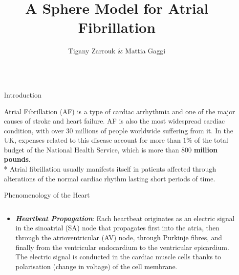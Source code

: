 \documentclass[final,hyperref={pdfpagelabels=false}]{beamer}
\title{\huge A Sphere Model for Atrial Fibrillation} %
\author{Tigany Zarrouk \& Mattia Gaggi } %
\institute{Supervisor: Kim Christensen.  Condensed Matter Theory Group---Imperial College London} %
\begin{document}

\begin{frame}[t] %

\begin{columns}[t] %

\begin{column}{.02\textwidth}\end{column} %

\begin{column}{.465\textwidth} %




            
\begin{block}{Introduction}


Atrial Fibrillation (AF) is a type of cardiac arrhythmia and one of the major causes of stroke and heart failure. AF is also the most widespread cardiac condition, with over 30 millions of people worldwide suffering from it. In the UK, expenses related to this disease account for more than $1\%$ of the total budget of the National Health Service, which is more than $800$ \textbf{million pounds}.\\*
 Atrial fibrillation usually manifests itself in patients affected through alterations of the normal cardiac rhythm lasting short periods of time.\\



\end{block}


\begin{block}{Phenomenology of the Heart}

\begin{columns}
\begin{column}{.54\textwidth}
	\begin{itemize}
	\item \textbf{\textit{Heartbeat Propagation}}: Each heartbeat originates as an electric signal in the sinoatrial (SA) node that propagates first into the atria, then through the atrioventricular (AV) node, through Purkinje fibres, and finally from the ventricular endocardium to the ventricular epicardium. The electric signal is conducted in the cardiac muscle cells thanks to polarisation (change in voltage) of the cell membrane. 
	\end{itemize}
\end{column}


\end{columns}
\end{block}
\end{column}
\end{columns}
\end{frame}
\end{document}
